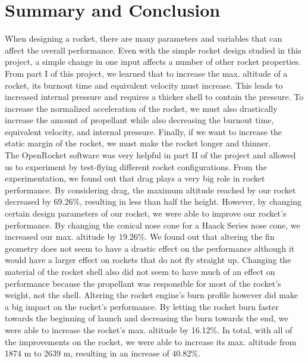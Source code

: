 \documentclass{report}
\begin{document}
\clearpage
\section*{Summary and Conclusion}

When designing a rocket, there are many parameters and variables that can affect the overall performance.
Even with the simple rocket design studied in this project, a simple change in one input affects a number of other rocket properties.
From part I of this project, we learned that to increase the max. altitude of a rocket, its burnout time and equivalent velocity must increase. 
This leads to increased internal pressure and requires a thicker shell to contain the pressure.
To increase the normalized acceleration of the rocket, we must also drastically increase the amount of propellant while also decreasing the burnout time, equivalent velocity, and internal pressure.
Finally, if we want to increase the static margin of the rocket, we must make the rocket longer and thinner.\\

\noindent The OpenRocket software was very helpful in part II of the project and allowed us to experiment by test-flying different rocket configurations.
From the experimentation, we found out that drag plays a very big role in rocket performance. 
By considering drag, the maximum altitude reached by our rocket decreased by 69.26\%, resulting in less than half the height.
However, by changing certain design parameters of our rocket, we were able to improve our rocket's performance.
By changing the conical nose cone for a Haack Series nose cone, we increased our max. altitude by 19.26\%.
We found out that altering the fin geometry does not seem to have a drastic effect on the performance although it would have a larger effect on rockets that do not fly straight up.
Changing the material of the rocket shell also did not seem to have much of an effect on performance because the propellant was responsible for most of the rocket's weight, not the shell.
Altering the rocket engine's burn profile however did make a big impact on the rocket's performance.
By letting the rocket burn faster towards the beginning of launch and decreasing the burn towards the end, we were able to increase the rocket's max. altitude by 16.12\%.
In total, with all of the improvements on the rocket, we were able to increase its max. altitude from 1874 m to 2639 m, resulting in an increase of 40.82\%.\\
\end{document}
